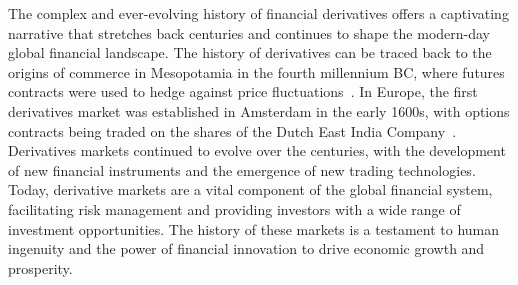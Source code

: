 
The complex and ever-evolving history of financial derivatives offers a captivating narrative that stretches back centuries and continues to shape the modern-day global financial landscape. The history of derivatives can be traced back to the origins of commerce in Mesopotamia in the fourth millennium BC, where futures contracts were used to hedge against price fluctuations~\cite{Weber2009AMarkets}. In Europe, the first derivatives market was established in Amsterdam in the early 1600s, with options contracts being traded on the shares of the Dutch East India Company~\cite{Petram2011The1602-1700}. Derivatives markets continued to evolve over the centuries, with the development of new financial instruments and the emergence of new trading technologies. Today, derivative markets are a vital component of the global financial system, facilitating risk management and providing investors with a wide range of investment opportunities. The history of these markets is a testament to human ingenuity and the power of financial innovation to drive economic growth and prosperity. 

